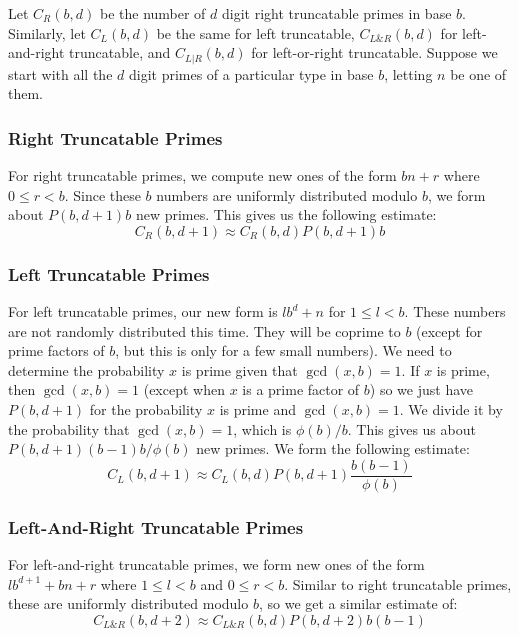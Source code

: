 \documentclass[12pt]{article}
\begin{document}
Let $C_R(b,d)$ be the number of $d$ digit right truncatable primes in base $b$. Similarly, let $C_L(b,d)$ be the same for left truncatable, $C_{L\&R}(b,d)$ for left-and-right truncatable, and $C_{L|R}(b,d)$ for left-or-right truncatable. Suppose we start with all the $d$ digit primes of a particular type in base $b$, letting $n$ be one of them.

\subsubsection{Right Truncatable Primes}

For right truncatable primes, we compute new ones of the form $bn+r$ where $0\leq r<b$. Since these $b$ numbers are uniformly distributed modulo $b$, we form about $P(b,d+1)b$ new primes. This gives us the following estimate:
\begin{equation}
C_R(b,d+1) \approx C_R(b,d)P(b,d+1)b
\end{equation}

\subsubsection{Left Truncatable Primes}

For left truncatable primes, our new form is $lb^d+n$ for $1\leq l<b$. These numbers are not randomly distributed this time. They will be coprime to $b$ (except for prime factors of $b$, but this is only for a few small numbers). We need to determine the probability $x$ is prime given that $\gcd(x,b)=1$. If $x$ is prime, then $\gcd(x,b)=1$ (except when $x$ is a prime factor of $b$) so we just have $P(b,d+1)$ for the probability $x$ is prime and $\gcd(x,b)=1$. We divide it by the probability that $\gcd(x,b)=1$, which is $\phi(b)/b$. This gives us about $P(b,d+1)(b-1)b/\phi(b)$ new primes. We form the following estimate:
\begin{equation}
C_L(b,d+1) \approx C_L(b,d)P(b,d+1)\frac{b(b-1)}{\phi(b)}
\end{equation}

\subsubsection{Left-And-Right Truncatable Primes}

For left-and-right truncatable primes, we form new ones of the form $lb^{d+1}+bn+r$ where $1\leq l<b$ and $0\leq r<b$. Similar to right truncatable primes, these are uniformly distributed modulo $b$, so we get a similar estimate of:
\begin{equation}
C_{L\&R}(b,d+2) \approx C_{L\&R}(b,d)P(b,d+2)b(b-1)
\end{equation}
\end{document}
